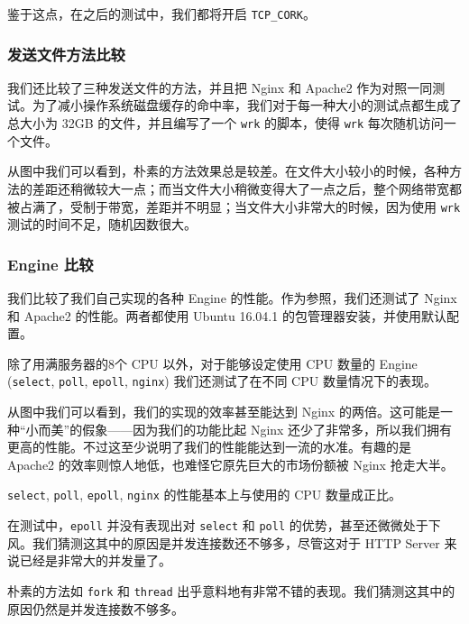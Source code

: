 \documentclass[a4paper]{article}
\begin{document}
鉴于这点，在之后的测试中，我们都将开启 \texttt{TCP\_CORK}。

\subsubsection{发送文件方法比较}

我们还比较了三种发送文件的方法，并且把 Nginx 和 Apache2 作为对照一同测试。为了减小操作系统磁盘缓存的命中率，我们对于每一种大小的测试点都生成了总大小为 32GB 的文件，并且编写了一个 \texttt{wrk} 的脚本，使得 \texttt{wrk} 每次随机访问一个文件。


从图中我们可以看到，朴素的方法效果总是较差。在文件大小较小的时候，各种方法的差距还稍微较大一点；而当文件大小稍微变得大了一点之后，整个网络带宽都被占满了，受制于带宽，差距并不明显；当文件大小非常大的时候，因为使用 \texttt{wrk} 测试的时间不足，随机因数很大。


\subsubsection{Engine 比较}

我们比较了我们自己实现的各种 Engine 的性能。作为参照，我们还测试了 Nginx 和 Apache2 的性能。两者都使用 Ubuntu 16.04.1 的包管理器安装，并使用默认配置。

除了用满服务器的8个 CPU 以外，对于能够设定使用 CPU 数量的 Engine (\texttt{select}, \texttt{poll}, \texttt{epoll}, \texttt{nginx}) 我们还测试了在不同 CPU 数量情况下的表现。


从图中我们可以看到，我们的实现的效率甚至能达到 Nginx 的两倍。这可能是一种``小而美''的假象------因为我们的功能比起 Nginx 还少了非常多，所以我们拥有更高的性能。不过这至少说明了我们的性能能达到一流的水准。有趣的是 Apache2 的效率则惊人地低，也难怪它原先巨大的市场份额被 Nginx 抢走大半。

\texttt{select}, \texttt{poll}, \texttt{epoll}, \texttt{nginx} 的性能基本上与使用的 CPU 数量成正比。

在测试中，\texttt{epoll} 并没有表现出对 \texttt{select} 和 \texttt{poll} 的优势，甚至还微微处于下风。我们猜测这其中的原因是并发连接数还不够多，尽管这对于 HTTP Server 来说已经是非常大的并发量了。

朴素的方法如 \texttt{fork} 和 \texttt{thread} 出乎意料地有非常不错的表现。我们猜测这其中的原因仍然是并发连接数不够多。


\end{document}
